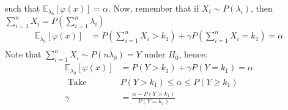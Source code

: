 \documentclass[a4paper]{article}
\begin{document}
such that $\mathbb{E}_{\lambda_0} \left[ \varphi\left( x \right)  \right] = \alpha$.
\newline\newline
Now, remember that if $X_i \sim P\left( \lambda_i \right) $, then $\sum_{i=1}^{n} X_i =  P\left( \sum_{i=1}^{n} \lambda_i \right) $ 
\begin{equation*}
	\begin{split}
		\mathbb{E}_{\lambda_0} \left[ \varphi\left( x \right)  \right] &= P\left( \sum_{i=1}^{n} X_i > k_1 \right) + \gamma P\left( \sum_{i=1}^{n} X_i = k_1 \right) = \alpha\\
	\end{split}
\end{equation*}
Note that $\sum_{i=1}^{n} X_i \sim P\left( n\lambda_0 \right) = Y$ under $H_0$, hence:
\begin{equation*}
	\begin{split}
		\mathbb{E}_{\lambda_0} \left[ \varphi\left( x \right)  \right] &= P\left( Y > k_1 \right) + \gamma P\left( Y = k_1 \right)   = \alpha\\
		\text{ Take } \;\; & P\left( Y > k_1 \right) \le  \alpha \le P\left( Y \ge k_1 \right)\\
		\gamma &= \frac{\alpha - P\left( Y > k_1 \right) }{P\left( Y = k_1 \right) }
	\end{split}
\end{equation*}
\end{document}
